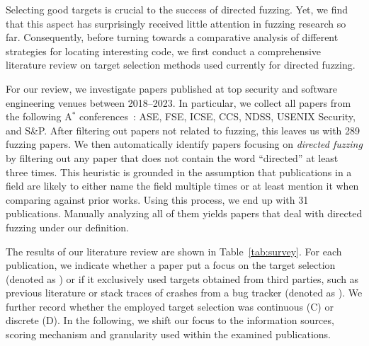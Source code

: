 Selecting good targets is crucial to the success of directed fuzzing. Yet, we find that this aspect has surprisingly received little attention in fuzzing research so far. Consequently, before turning towards a comparative analysis of different strategies for locating interesting code, we first conduct a comprehensive literature review on target selection methods used currently for directed fuzzing.

 For our review, 
we investigate papers published at top security and software engineering venues between 2018--2023. In particular, we collect all papers from the following A$^*$ conferences~\cite{coreranking}: ASE, FSE, ICSE, CCS, NDSS, USENIX Security, and S\&P. After filtering out papers not related to fuzzing, this leaves us with 289 fuzzing papers. We then automatically identify papers focusing on \emph{directed fuzzing} by filtering out any paper that does not contain the word ``directed'' at least three times. This heuristic is grounded in the assumption that publications in a field are likely to either name the field multiple times or at least mention it when comparing against prior works. Using this process, we end up with 31 publications. Manually analyzing all of them yields \numanalyzedpapers papers that deal with directed fuzzing under our definition. 


The results of our literature review are shown in Table~\ref{tab:survey}. For each publication, we indicate whether a paper put a focus on the target selection (denoted as \cmark{}) or if it exclusively used targets obtained from third parties, such as previous literature or stack traces of crashes from a bug tracker (denoted as \xmark{}). We further record whether the employed target selection was continuous (C) or discrete (D). 
In the following, we shift our focus to the information sources, scoring mechanism and granularity used within the examined publications.

